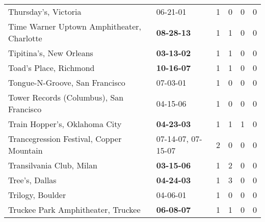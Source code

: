 \begin{longtable}{p{}p{}p{}p{}p{}p{}}
                                                         Thursday's, Victoria &                                                06-21-01\textsuperscript{} &  1 &  0 &  0 &  0 \\
                                   Time Warner Uptown Amphitheater, Charlotte &                                       \textbf{08-28-13\textsuperscript{}} &  1 &  1 &  0 &  0 \\
                                                      Tipitina's, New Orleans &                                       \textbf{03-13-02\textsuperscript{}} &  1 &  1 &  0 &  0 \\
                                                       Toad's Place, Richmond &                                       \textbf{10-16-07\textsuperscript{}} &  1 &  1 &  0 &  0 \\
                                               Tongue-N-Groove, San Francisco &                                                07-03-01\textsuperscript{} &  1 &  0 &  0 &  0 \\
                                      Tower Records (Columbus), San Francisco &                                                04-15-06\textsuperscript{} &  1 &  0 &  0 &  0 \\
                                                Train Hopper's, Oklahoma City &                                       \textbf{04-23-03\textsuperscript{}} &  1 &  1 &  1 &  0 \\
                                     Trancegression Festival, Copper Mountain &                    07-14-07\textsuperscript{}, 07-15-07\textsuperscript{} &  2 &  0 &  0 &  0 \\
                                                     Transilvania Club, Milan &                                       \textbf{03-15-06\textsuperscript{}} &  1 &  2 &  0 &  0 \\
                                                               Tree's, Dallas &                                       \textbf{04-24-03\textsuperscript{}} &  1 &  3 &  0 &  0 \\
                                                             Trilogy, Boulder &                                                04-06-01\textsuperscript{} &  1 &  0 &  0 &  0 \\
                                           Truckee Park Amphitheater, Truckee &                                       \textbf{06-08-07\textsuperscript{}} &  1 &  1 &  0 &  0 \\

\end{longtable}
